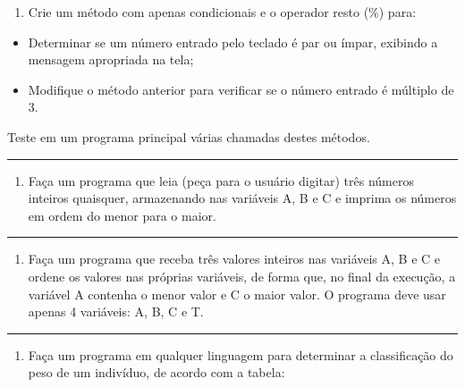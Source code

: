 \documentclass[12pt,a4paper]{article}
\renewcommand{\linethickness}{0.05em}
\providecommand{\tightlist}{%
      \setlength{\itemsep}{0pt}\setlength{\parskip}{0pt}}
\begin{document}
\begin{enumerate}
\def\labelenumi{\arabic{enumi}.}
\tightlist
\item
  Crie um método com apenas condicionais e o operador resto (\%) para:
\end{enumerate}

\begin{itemize}
\tightlist
\item
  Determinar se um número entrado pelo teclado é par ou ímpar, exibindo
  a mensagem apropriada na tela;\\
\item
  Modifique o método anterior para verificar se o número entrado é
  múltiplo de 3.
\end{itemize}

Teste em um programa principal várias chamadas destes métodos.

    \begin{center}\rule{0.5\linewidth}{\linethickness}\end{center}

\begin{enumerate}
\def\labelenumi{\arabic{enumi}.}
\setcounter{enumi}{1}
\tightlist
\item
  Faça um programa que leia (peça para o usuário digitar) três números
  inteiros quaisquer, armazenando nas variáveis A, B e C e imprima os
  números em ordem do menor para o maior.
\end{enumerate}

    \begin{center}\rule{0.5\linewidth}{\linethickness}\end{center}

\begin{enumerate}
\def\labelenumi{\arabic{enumi}.}
\setcounter{enumi}{2}
\tightlist
\item
  Faça um programa que receba três valores inteiros nas variáveis A, B e
  C e ordene os valores nas próprias variáveis, de forma que, no final
  da execução, a variável A contenha o menor valor e C o maior valor. O
  programa deve usar apenas 4 variáveis: A, B, C e T.
\end{enumerate}

    \begin{center}\rule{0.5\linewidth}{\linethickness}\end{center}

\begin{enumerate}
\def\labelenumi{\arabic{enumi}.}
\setcounter{enumi}{3}
\tightlist
\item
  Faça um programa em qualquer linguagem para determinar a classificação
  do peso de um indivíduo, de acordo com a tabela:
\end{enumerate}
\end{document}
